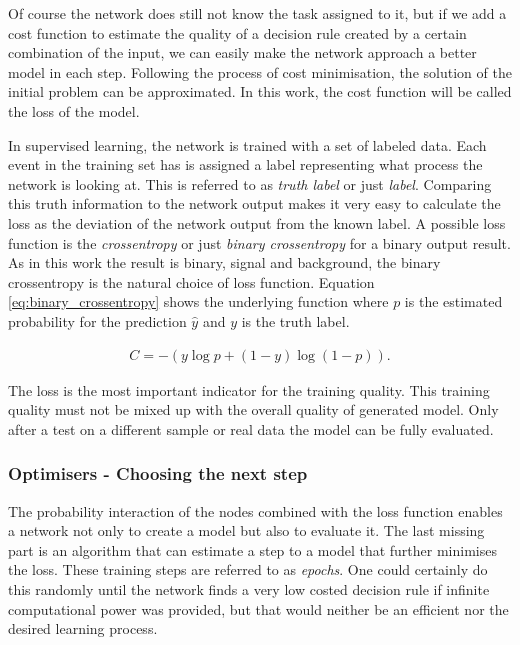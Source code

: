 Of course the network does still not know the task assigned to it, but if we add a cost function to estimate the quality of a decision rule created by a certain combination of the input, we can easily make the network approach a better model in each step. Following the process of cost minimisation, the solution of the initial problem can be approximated.
In this work, the cost function will be called the loss of the model.

In supervised learning, the network is trained with a set of labeled data. Each event in the training set has is assigned a label representing what process the network is looking at. This is referred to as \emph{truth label} or just \emph{label}. Comparing this truth information to the network output makes it very easy to calculate the loss as the deviation of the network output from the known label. A possible loss function is the \emph{crossentropy} or just \emph{binary crossentropy} for a binary output result. As in this work the result is binary, signal and background, the binary crossentropy is the natural choice of loss function. Equation \eqref{eq:binary_crossentropy} shows the underlying function where $p$ is the estimated probability for the prediction $\hat{y}$ and $y$ is the truth label.

\begin{align}
    C = -(y \log p + (1 - y) \log (1 - p) ).
    \label{eq:binary_crossentropy}
\end{align}

The loss is the most important indicator for the training quality. This training quality must not be mixed up with the overall quality of generated model. Only after a test on a different sample or real data the model can be fully evaluated.

\subsubsection{Optimisers - Choosing the next step}
\label{sec:optimisation}

The probability interaction of the nodes combined with the loss function enables a network not only to create a model but also to evaluate it. The last missing part is an algorithm that can estimate a step to a model that further minimises the loss. These training steps are referred to as \emph{epochs}. One could certainly do this randomly until the network finds a very low costed decision rule if infinite computational power was provided, but that would neither be an efficient nor the desired learning process.

